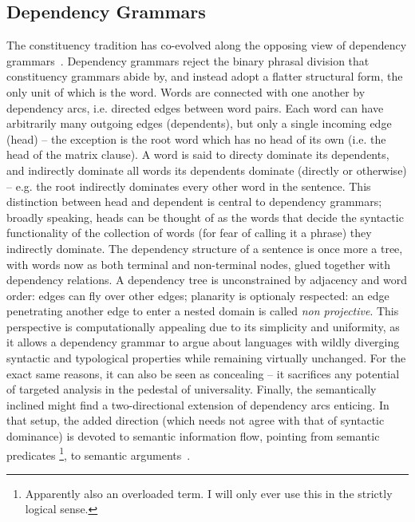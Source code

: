 \subsection{Dependency Grammars}
\label{subsection:dep_grammars}
The constituency tradition has co-evolved along the opposing view of dependency grammars~\cite[inter alia]{tesniere2015elements,gaifman1965dependency,sgall1986meaning,mel1988dependency,sleator1995parsing}.
Dependency grammars reject the binary phrasal division that constituency grammars abide by, and instead adopt a flatter structural form, the only unit of which is the word.
Words are connected with one another by dependency arcs, i.e. directed edges between word pairs.
Each word can have arbitrarily many outgoing edges (dependents), but only a single incoming edge (head) -- the exception is the root word which has no head of its own (i.e. the head of the matrix clause).
A word is said to directy dominate its dependents, and indirectly dominate all words its dependents dominate (directly or otherwise) -- e.g. the root indirectly dominates every other word in the sentence.
This distinction between head and dependent is central to dependency grammars; broadly speaking, heads can be thought of as the words that decide the syntactic functionality of the collection of words (for fear of calling it a phrase) they indirectly dominate.
The dependency structure of a sentence is once more a tree, with words now as both terminal and non-terminal nodes, glued together with dependency relations.
A dependency tree is unconstrained by adjacency and word order: edges can fly over other edges; planarity is optionaly respected: an edge penetrating another edge to enter a nested domain is called \textit{non projective}.
This perspective is computationally appealing due to its simplicity and uniformity, as it allows a dependency grammar to argue about languages with wildly diverging syntactic and typological properties while remaining virtually unchanged.
For the exact same reasons, it can also be seen as concealing -- it sacrifices any potential of targeted analysis in the pedestal of universality.
Finally, the semantically inclined might find a two-directional extension of dependency arcs enticing.
In that setup, the added direction (which needs not agree with that of syntactic dominance) is devoted to semantic information flow, pointing from semantic predicates%
	\footnote{Apparently also an overloaded term. I will only ever use this in the strictly logical sense.},
to semantic arguments~\cite{mel2003levels}.

